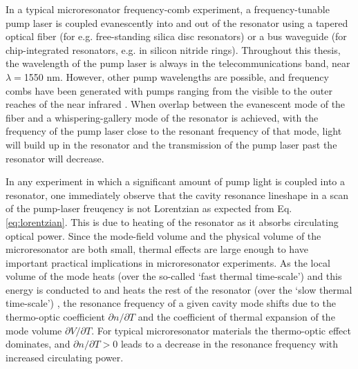 In a typical microresonator frequency-comb experiment, a frequency-tunable pump laser is coupled evanescently into and out of the resonator using a tapered optical fiber (for e.g. free-standing silica disc resonators) or a bus waveguide (for chip-integrated resonators, e.g. in silicon nitride rings). Throughout this thesis, the wavelength of the pump laser is always in the telecommunications band, near $\lambda=$1550 nm. However, other pump wavelengths are possible, and frequency combs have been generated with pumps ranging from the visible \cite{visiblecombs} to the outer reaches of the near infrared \cite{midIRcombs}. When overlap between the evanescent mode of the fiber and a whispering-gallery mode of the resonator is achieved, with the frequency of the pump laser close to the resonant frequency of that mode, light will build up in the resonator and the transmission of the pump laser past the resonator will decrease.

In any experiment in which a significant amount of pump light is coupled into a resonator, one immediately observe that the cavity resonance lineshape in a scan of the pump-laser freuqency is not Lorentzian as expected from Eq. \ref{eq:lorentzian}. This is due to heating of the resonator as it absorbs circulating optical power. Since the mode-field volume and the physical volume of the microresonator are both small, thermal effects are large enough to have important practical implications in microresonator experiments. As the local volume of the mode heats (over the so-called `fast thermal time-scale') and this energy is conducted to and heats the rest of the resonator (over the `slow thermal time-scale') \cite{distinctThermalTimescales}, the resonance frequency of a given cavity mode shifts due to the thermo-optic coefficient $\partial n/\partial T$ and the coefficient of thermal expansion of the mode volume $\partial V/\partial T$. For typical microresonator materials the thermo-optic effect dominates, and $\partial n/\partial T>0$ leads to a decrease in the resonance frequency with increased circulating power.

